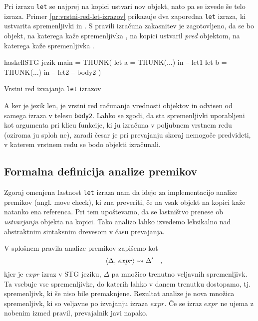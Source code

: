 Pri izrazu \texttt{let} se najprej na kopici ustvari nov objekt, nato pa se izvede še telo izraza. Primer \ref{pr:vrstni-red-let-izrazov} prikazuje dva zaporedna \texttt{let} izraza, ki ustvarita spremenljivki  in . S pravili izračuna zakasnitev je zagotovljeno, da se bo objekt, na katerega kaže spremenljivka , na kopici ustvaril \emph{pred} objektom, na katerega kaže spremenljivka .

\begin{primer}[ht]
\centering
\begin{code-box}{haskell}{STG jezik \cmark}
main = THUNK(
    let a = THUNK(...) in -- let1
    let b = THUNK(...) in -- let2
        -- body2
)
\end{code-box}
\caption{Vrstni red izvajanja \texttt{let} izrazov}
\label{pr:vrstni-red-let-izrazov}
\end{primer}


A ker je jezik len, je vrstni red računanja vrednosti objektov  in  odvisen od samega izraza v telesu \texttt{body2}. Lahko se zgodi, da sta spremenljivki uporabljeni kot argumenta pri klicu funkcije, ki ju izračuna v poljubnem vrstnem redu (oziroma ju sploh ne), zaradi česar je pri prevajanju skoraj nemogoče predvideti, v katerem vrstnem redu se bodo objekti izračunali.

\subsection{Formalna definicija analize premikov}
Zgoraj omenjena lastnost \texttt{let} izraza nam da idejo za implementacijo analize premikov (angl. move check), ki zna preveriti, če na vsak objekt na kopici kaže natanko ena referenca. Pri tem upoštevamo, da se las\-tni\-štvo prenese ob \textit{ustvarjanju} objekta na kopici. Tako analizo lahko izvedemo leksikalno nad abstraktnim sintaksnim drevesom v času prevajanja.

V splošnem pravila analize premikov zapišemo kot
\begin{equation*}
    \langle \Delta, \, expr \rangle \leadsto \Delta'
    \label{eq:analiza-premikov-oblika-pravil}
    \rlap{\quad\mbox{,}}
\end{equation*}
kjer je $expr$ izraz v STG jeziku, $\Delta$ pa množico trenutno veljavnih spremenljivk. Ta vsebuje vse spremenljivke, do katerih lahko v danem trenutku dostopamo, tj. spremenljivk, ki še niso bile premaknjene. Rezultat analize je nova množica spremenljivk, ki so veljavne po izvajanju izraza $expr$. Če se izraz $expr$ ne ujema z nobenim izmed pravil, prevajalnik javi napako.

